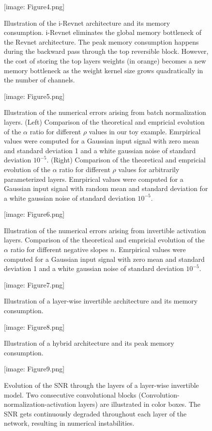 \documentclass[twocolumn]{bmcart}
\def\texttt{[image: ]}
\begin{document}
\begin{backmatter}
\begin{figure}[t]
\texttt{[image: Figure4.png]}
\caption{
Illustration of the i-Revnet architecture and its memory consumption.
i-Revnet eliminates the global memory bottleneck of the Revnet architecture.
The peak memory consumption happens during the backward pass through the top reversible block.
However, the cost of storing the top layers weights (in orange) becomes a new memory bottleneck as the 
weight kernel size grows quadratically in the number of channels.
}
\end{figure}


\begin{figure}[t]
\texttt{[image: Figure5.png]}
\caption{
Illustration of the numerical errors arising from batch normalization layers.
(Left) Comparison of the theoretical and empricial evolution of the $\alpha$ ratio for different $\rho$ values in our toy example.
Emrpirical values were computed for a Gaussian input signal with zero mean and standard deviation 1 and a white gaussian noise of standard deviation $10^{-5}$.
(Right) Comparison of the theoretical and empricial evolution of the $\alpha$ ratio for different $\rho$ values for arbitrarily parameterized layers.
Emrpirical values were computed for a Gaussian input signal with random mean and standard deviation for a white gaussian noise of standard deviation $10^{-5}$.
}
\end{figure}

\begin{figure}[t]
\texttt{[image: Figure6.png]}
\caption{
Illustration of the numerical errors arising from invertible activation layers.
Comparison of the theoretical and empricial evolution of the $\alpha$ ratio for different negative slopes $n$.
Emrpirical values were computed for a Gaussian input signal with zero mean and standard deviation 1 and a white gaussian noise of standard deviation $10^{-5}$.
}
\end{figure}
\begin{figure}[t]
\texttt{[image: Figure7.png]}
\caption{
Illustration of a layer-wise invertible architecture and its memory consumption. 
}
\end{figure}

\begin{figure}[t]
\texttt{[image: Figure8.png]}
\caption{
Illustration of a hybrid architecture and its peak memory consumption. 
}
\end{figure}

\begin{figure}[t]
\texttt{[image: Figure9.png]}
\caption{
Evolution of the SNR through the layers of a layer-wise invertible model.
Two consecutive convolutional blocks (Convolution-normalization-activation layers) are illustrated in color boxes.
The SNR gets continuously degraded throughout each layer of the network, resulting in numerical instabilities.
}
\end{figure}


\end{backmatter}
\end{document}
